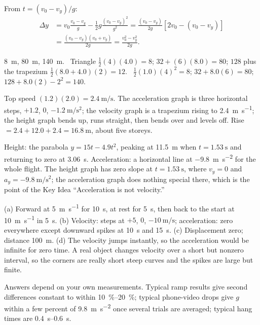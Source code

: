 \documentclass[11pt,twoside,openany]{book}
\newcommand{\viewtag}[3]{\fcolorbox{#2}{#3}{\footnotesize\textbf{\textcolor{#2}{#1}}}}
\newcommand{\elemtag}{\viewtag{Elementary}{elemcol}{elempale}}
\newcommand{\calctag}{\viewtag{Calculus}{calccol}{calcpale}}
\begin{document}
\begin{description}[leftmargin=2.6em,itemsep=3pt,style=sameline]
  \item[2.51] From $t = (v_0 - v_y)/g$:
  \begin{align*}
  \Delta y &= v_0\frac{v_0 - v_y}{g} - \tfrac12 g\frac{(v_0 - v_y)^2}{g^2} = \frac{(v_0 - v_y)}{2g}\left[2v_0 - (v_0 - v_y)\right] \\
  &= \frac{(v_0 - v_y)(v_0 + v_y)}{2g} = \frac{v_0^2 - v_y^2}{2g}.
  \end{align*}
  \item[2.52] \SI{8}{\metre}, \SI{80}{\metre}, \SI{140}{\metre}. \elemtag\ Triangle $\tfrac12(4)(4.0) = 8$; $32 + (6)(8.0) = 80$; $128$ plus the trapezium $\tfrac12(8.0 + 4.0)(2) = 12$. \calctag\ $\tfrac12(1.0)(4)^2 = 8$; $32 + 8.0(6) = 80$; $128 + 8.0(2) - 2^2 = 140$.
  \item[2.53] Top speed $(1.2)(2.0) = \SI{2.4}{\metre\per\second}$. The acceleration graph is three horizontal steps, $+1.2$, $0$, $-1.2\ \si{\metre\per\second\squared}$; the velocity graph is a trapezium rising to \SI{2.4}{\metre\per\second}; the height graph bends up, runs straight, then bends over and levels off. Rise $= 2.4 + 12.0 + 2.4 = \SI{16.8}{\metre}$, about five storeys.
  \item[2.54] Height: the parabola $y = 15t - 4.9t^2$, peaking at \SI{11.5}{\metre} when $t = \SI{1.53}{\second}$ and returning to zero at \SI{3.06}{\second}. Acceleration: a horizontal line at \SI{-9.8}{\metre\per\second\squared} for the whole flight. The height graph has zero slope at $t = \SI{1.53}{\second}$, where $v_y = 0$ and $a_y = \SI{-9.8}{\metre\per\second\squared}$; the acceleration graph does nothing special there, which is the point of the Key Idea ``Acceleration is not velocity.''
  \item[2.55] (a) Forward at \SI{5}{\metre\per\second} for \SI{10}{\second}, at rest for \SI{5}{\second}, then back to the start at \SI{10}{\metre\per\second} in \SI{5}{\second}. (b) Velocity: steps at $+5$, $0$, $-10\ \si{\metre\per\second}$; acceleration: zero everywhere except downward spikes at \SI{10}{\second} and \SI{15}{\second}. (c) Displacement zero; distance \SI{100}{\metre}. (d) The velocity jumps instantly, so the acceleration would be infinite for zero time. A real object changes velocity over a short but nonzero interval, so the corners are really short steep curves and the spikes are large but finite.
  \item[2.56--2.59] Answers depend on your own measurements. Typical ramp results give second differences constant to within \SIrange{10}{20}{\percent}; typical phone-video drops give $g$ within a few percent of \SI{9.8}{\metre\per\second\squared} once several trials are averaged; typical hang times are \SIrange{0.4}{0.6}{\second}.
\end{description}
\end{document}
